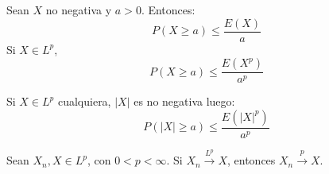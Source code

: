 \begin{proposition}
    Sean $X$ no negativa y $a > 0$.
    Entonces:
    $$P(X \geq a) \leq \frac{E(X)}{a}$$
    Si $X \in L^p$,
    $$P(X \geq a) \leq \frac{E(X^p)}{a^p}$$
\end{proposition}

\begin{remark}
    Si $X \in L^p$ cualquiera, $|X|$ es no negativa luego:
    $$P(|X| \geq a) \leq \frac{E(|X|^p)}{a^p}$$
\end{remark}

\begin{theorem}
    Sean $X_n, X \in L^p$, con $0 < p < \infty$.
    Si $X_n \xrightarrow{L^p} X$, entonces $X_n \xrightarrow{p} X$.
\end{theorem}